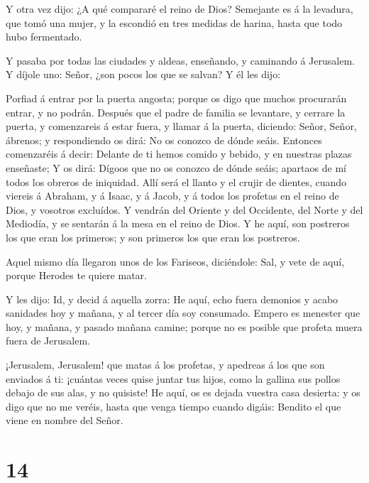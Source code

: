  Y otra vez dijo: ¿A qué compararé el reino de Dios?
 Semejante es á la levadura, que tomó una mujer, y la
escondió en tres medidas de harina, hasta que todo hubo fermentado.

 Y pasaba por todas las ciudades y aldeas, enseñando, y
caminando á Jerusalem.  Y díjole uno: Señor, ¿son pocos los
que se salvan? Y él les dijo:

 Porfiad á entrar por la puerta angosta; porque os digo que
muchos procurarán entrar, y no podrán.  Después que el
padre de familia se levantare, y cerrare la puerta, y comenzareis á
estar fuera, y llamar á la puerta, diciendo: Señor, Señor, ábrenos; y
respondiendo os dirá: No os conozco de dónde seáis. 
Entonces comenzaréis á decir: Delante de ti hemos comido y bebido, y en
nuestras plazas enseñaste;  Y os dirá: Dígoos que no os
conozco de dónde seáis; apartaos de mí todos los obreros de iniquidad.
 Allí será el llanto y el crujir de dientes, cuando viereis
á Abraham, y á Isaac, y á Jacob, y á todos los profetas en el reino de
Dios, y vosotros excluídos.  Y vendrán del Oriente y del
Occidente, del Norte y del Mediodía, y se sentarán á la mesa en el reino
de Dios.  Y he aquí, son postreros los que eran los
primeros; y son primeros los que eran los postreros.

 Aquel mismo día llegaron unos de los Fariseos, diciéndole:
Sal, y vete de aquí, porque Herodes te quiere matar.

 Y les dijo: Id, y decid á aquella zorra: He aquí, echo
fuera demonios y acabo sanidades hoy y mañana, y al tercer día soy
consumado.  Empero es menester que hoy, y mañana, y pasado
mañana camine; porque no es posible que profeta muera fuera de
Jerusalem.

 ¡Jerusalem, Jerusalem! que matas á los profetas, y
apedreas á los que son enviados á ti: ¡cuántas veces quise juntar tus
hijos, como la gallina sus pollos debajo de sus alas, y no quisiste!
 He aquí, os es dejada vuestra casa desierta: y os digo que
no me veréis, hasta que venga tiempo cuando digáis: Bendito el que viene
en nombre del Señor.

\hypertarget{section-13}{%
\section{14}\label{section-13}}


